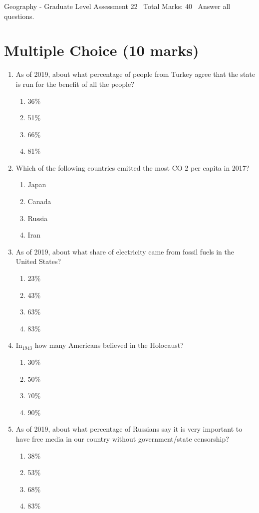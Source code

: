 \documentclass[12pt]{article}
\begin{document}
\begin{center}
Geography - Graduate Level Assessment 22 \
Total Marks: 40 \
Answer all questions.
\end{center}

\section*{Multiple Choice (10 marks)}
\begin{enumerate}[label=\arabic*.]
\item As of 2019, about what percentage of people from Turkey agree that the state is run for the benefit of all the people?
\begin{enumerate}[label=(\alph*)]
    \item 36\%
    \item 51\%
    \item 66\%
    \item 81\%
\end{enumerate}
\item Which of the following countries emitted the most CO 2 per capita in 2017?
\begin{enumerate}[label=(\alph*)]
    \item Japan
    \item Canada
    \item Russia
    \item Iran
\end{enumerate}
\item As of 2019, about what share of electricity came from fossil fuels in the United States?
\begin{enumerate}[label=(\alph*)]
    \item 23\%
    \item 43\%
    \item 63\%
    \item 83\%
\end{enumerate}
\item In$_{1943}$ how many Americans believed in the Holocaust?
\begin{enumerate}[label=(\alph*)]
    \item 30\%
    \item 50\%
    \item 70\%
    \item 90\%
\end{enumerate}
\item As of 2019, about what percentage of Russians say it is very important to have free media in our country without government/state censorship?
\begin{enumerate}[label=(\alph*)]
    \item 38\%
    \item 53\%
    \item 68\%
    \item 83\%
\end{enumerate}
\end{enumerate}
\end{document}
